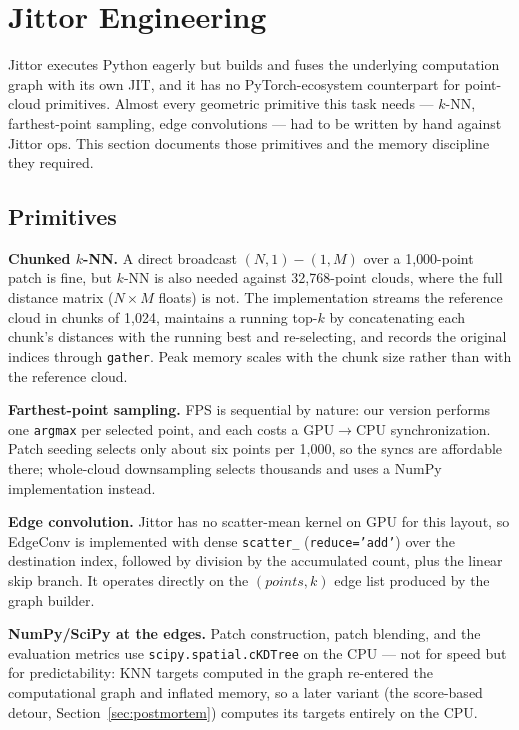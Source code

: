 \documentclass{article}
\begin{document}
\section{Jittor Engineering}
\label{sec:jittor}

Jittor executes Python eagerly but builds and fuses the underlying computation graph with its own JIT, and it has no PyTorch-ecosystem counterpart for point-cloud primitives. Almost every geometric primitive this task needs --- $k$-NN, farthest-point sampling, edge convolutions --- had to be written by hand against Jittor ops. This section documents those primitives and the memory discipline they required.

\subsection{Primitives}

\textbf{Chunked $k$-NN.} A direct broadcast $(N, 1) - (1, M)$ over a 1{,}000-point patch is fine, but $k$-NN is also needed against 32{,}768-point clouds, where the full distance matrix ($N \times M$ floats) is not. The implementation streams the reference cloud in chunks of 1{,}024, maintains a running top-$k$ by concatenating each chunk's distances with the running best and re-selecting, and records the original indices through \texttt{gather}. Peak memory scales with the chunk size rather than with the reference cloud.

\textbf{Farthest-point sampling.} FPS is sequential by nature: our version performs one \texttt{argmax} per selected point, and each costs a GPU$\to$CPU synchronization. Patch seeding selects only about six points per 1{,}000, so the syncs are affordable there; whole-cloud downsampling selects thousands and uses a NumPy implementation instead.

\textbf{Edge convolution.} Jittor has no scatter-mean kernel on GPU for this layout, so EdgeConv is implemented with dense \texttt{scatter\_} (\texttt{reduce='add'}) over the destination index, followed by division by the accumulated count, plus the linear skip branch. It operates directly on the $(points, k)$ edge list produced by the graph builder.

\textbf{NumPy/SciPy at the edges.} Patch construction, patch blending, and the evaluation metrics use \texttt{scipy.spatial.cKDTree} on the CPU --- not for speed but for predictability: KNN targets computed in the graph re-entered the computational graph and inflated memory, so a later variant (the score-based detour, Section~\ref{sec:postmortem}) computes its targets entirely on the CPU.
\end{document}
